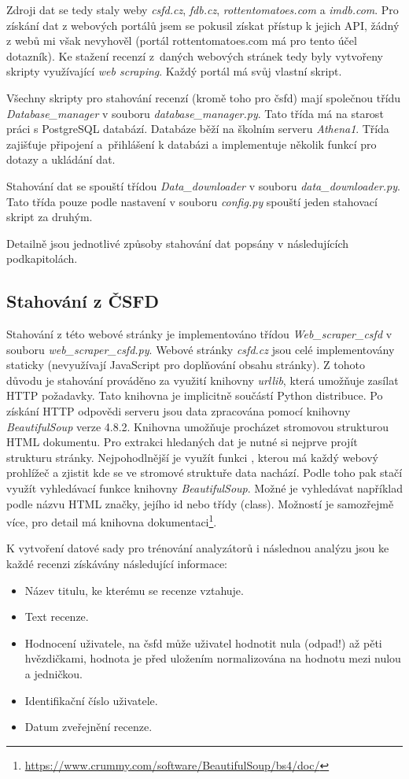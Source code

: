 Zdroji dat se tedy staly weby \emph{csfd.cz}, \emph{fdb.cz}, \emph{rottentomatoes.com} a \emph{imdb.com}.
Pro získání dat z webových portálů jsem se pokusil získat přístup k jejich API, žádný z webů mi však nevyhověl (portál rottentomatoes.com má pro tento účel dotazník). 
Ke stažení recenzí z~daných webových stránek  tedy byly vytvořeny skripty využívající \emph{web scraping}. Každý portál má svůj vlastní skript. 

Všechny skripty pro stahování recenzí (kromě toho pro čsfd) mají společnou třídu \emph{Database\_manager} v souboru \emph{database\_manager.py}. Tato třída má na starost práci s PostgreSQL databází. Databáze běží na školním serveru \emph{Athena1}. Třída zajišťuje připojení a~přihlášení k databázi a implementuje několik funkcí pro dotazy a ukládání dat.

Stahování dat se spouští třídou \emph{Data\_downloader} v souboru \emph{data\_downloader.py}. Tato třída pouze podle nastavení v souboru \emph{config.py} spouští jeden stahovací skript za druhým.

Detailně jsou jednotlivé způsoby stahování dat popsány v následujících podkapitolách. 


\subsection{Stahování z ČSFD}

Stahování z této webové stránky je implementováno třídou \emph{Web\_scraper\_csfd} v souboru \emph{web\_scraper\_csfd.py}. Webové stránky \emph{csfd.cz} jsou celé implementovány staticky (nevyužívají JavaScript pro doplňování obsahu stránky). Z tohoto důvodu je stahování prováděno za využití knihovny \emph{urllib}, která umožňuje zasílat HTTP požadavky. Tato knihovna je implicitně součástí Python distribuce. Po získání HTTP odpovědi serveru jsou data zpracována pomocí knihovny \emph{BeautifulSoup} verze 4.8.2. Knihovna umožňuje procházet stromovou strukturou HTML dokumentu. 
Pro extrakci hledaných dat je nutné si nejprve projít strukturu stránky. Nejpohodlnější je využít funkci , kterou má každý webový prohlížeč a zjistit kde se ve stromové struktuře data nachází. Podle toho pak stačí využít vyhledávací funkce knihovny \emph{BeautifulSoup}. Možné je vyhledávat například podle názvu HTML značky, jejího id nebo třídy (class). Možností je samozřejmě více, pro detail má knihovna dokumentaci\footnote{\url{https://www.crummy.com/software/BeautifulSoup/bs4/doc/}}.

K vytvoření datové sady pro trénování analyzátorů i následnou analýzu jsou ke každé recenzi získávány následující informace:
\begin{itemize}
    \item Název titulu, ke kterému se recenze vztahuje.
    \item Text recenze.
    \item Hodnocení uživatele, na čsfd může uživatel hodnotit nula (odpad!) až pěti hvězdičkami, hodnota je před uložením normalizována na hodnotu mezi nulou a jedničkou.
    \item Identifikační číslo uživatele.
    \item Datum zveřejnění recenze.
\end{itemize}

